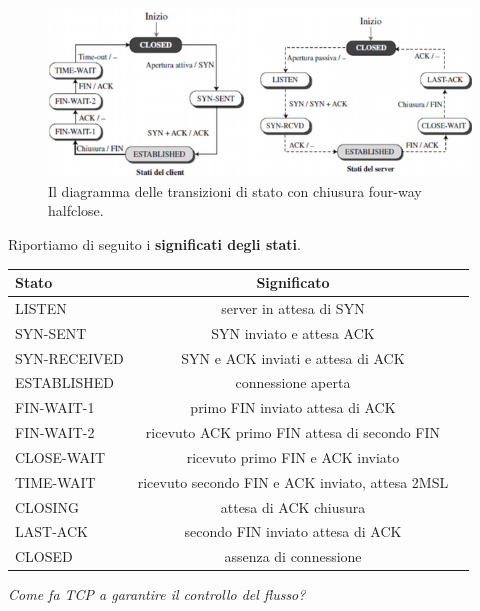 \documentclass[11pt,a4paper]{article}
\theoremstyle{definition}
\begin{document}
\newpage
\begin{figure}[!h]
	\includegraphics[scale=0.6]{Immagini/ASF_halfclose.png}
	\centering
	\caption{Il diagramma delle transizioni di stato con chiusura four-way halfclose.}
\end{figure}
Riportiamo di seguito i \textbf{significati degli stati}.
\begin{table}[h!]
	\begin{center}
		\label{tab:table1}
		\begin{tabular}{l|c|c}
			\textbf{Stato} & \textbf{Significato}                            \\
			\hline
			LISTEN         & server in attesa di SYN                         \\
			SYN-SENT       & SYN inviato e attesa ACK                        \\
			SYN-RECEIVED   & SYN e ACK inviati e attesa di ACK               \\
			ESTABLISHED    & connessione aperta                              \\
			FIN-WAIT-1     & primo FIN inviato attesa di ACK                 \\
			FIN-WAIT-2     & ricevuto ACK primo FIN attesa di secondo FIN    \\
			CLOSE-WAIT     & ricevuto primo FIN e ACK inviato                \\
			TIME-WAIT      & ricevuto secondo FIN e ACK inviato, attesa 2MSL \\
			CLOSING        & attesa di ACK chiusura                          \\
			LAST-ACK       & secondo FIN inviato attesa di ACK               \\
			CLOSED         & assenza di connessione                          \\
		\end{tabular}
	\end{center}
\end{table}
\begin{flushleft}
	\textit{Come fa TCP a garantire il controllo del flusso?}
\end{flushleft}
\end{document}
